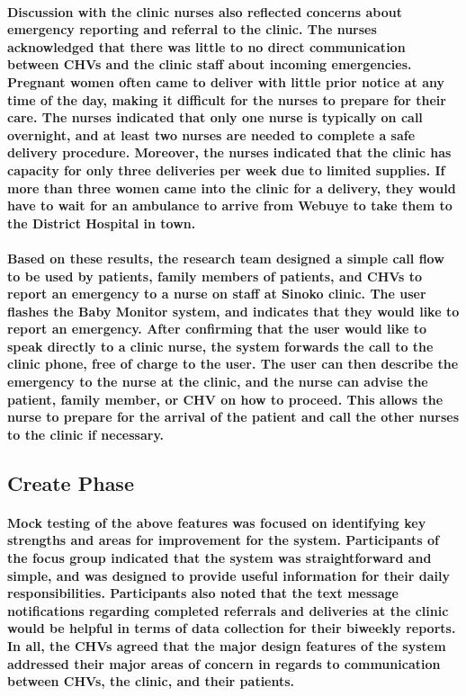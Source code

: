 \paragraph{Discussion with the clinic nurses also reflected concerns about emergency reporting and referral to the clinic. The nurses acknowledged that there was little to no direct communication between CHVs and the clinic staff about incoming emergencies. Pregnant women often came to deliver with little prior notice at any time of the day, making it difficult for the nurses to prepare for their care. The nurses indicated that only one nurse is typically on call overnight, and at least two nurses are needed to complete a safe delivery procedure. Moreover, the nurses indicated that the clinic has capacity for only three deliveries per week due to limited supplies. If more than three women came into the clinic for a delivery, they would have to wait for an ambulance to arrive from Webuye to take them to the District Hospital in town.}

\paragraph{Based on these results, the research team designed a simple call flow to be used by patients, family members of patients, and CHVs to report an emergency to a nurse on staff at Sinoko clinic. The user flashes the Baby Monitor system, and indicates that they would like to report an emergency. After confirming that the user would like to speak directly to a clinic nurse, the system forwards the call to the clinic phone, free of charge to the user. The user can then describe the emergency to the nurse at the clinic, and the nurse can advise the patient, family member, or CHV on how to proceed. This allows the nurse to prepare for the arrival of the patient and call the other nurses to the clinic if necessary.}

\subsection{Create Phase}
\paragraph{Mock testing of the above features was focused on identifying key strengths and areas for improvement for the system. Participants of the focus group indicated that the system was straightforward and simple, and was designed to provide useful information for their daily responsibilities. Participants also noted that the text message notifications regarding completed referrals and deliveries at the clinic would be helpful in terms of data collection for their biweekly reports. In all, the CHVs agreed that the major design features of the system addressed their major areas of concern in regards to communication between CHVs, the clinic, and their patients.}

